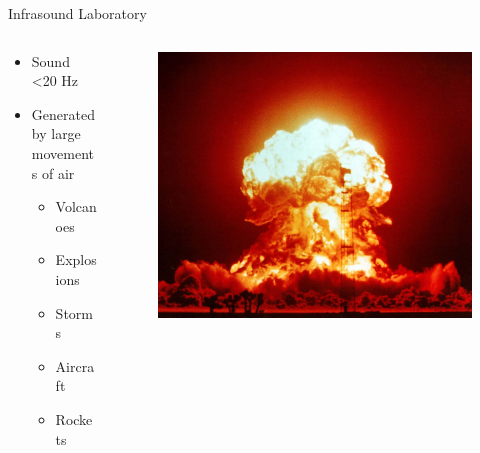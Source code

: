 \documentclass{beamer}
\begin{document}
\begin{frame}{Infrasound Laboratory}
\begin{columns}
	\begin{column}{.60\textwidth}
		\begin{itemize}
			\item Sound <20 Hz
			\item Generated by large movements of air
			\begin{itemize}
				\item Volcanoes
				\item Explosions
				\item Storms
				\item Aircraft
				\item Rockets
			\end{itemize}
		\end{itemize}
	\end{column}
	\begin{column}{.40\textwidth}
		\begin{figure}
			\includegraphics[width=\linewidth]{img/nuke.jpg}
		\end{figure}
	\end{column}
\end{columns}
\end{frame}
\end{document}

